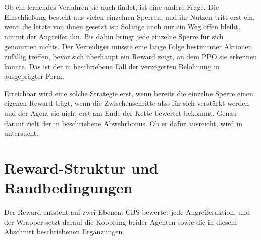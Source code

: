 Ob ein lernendes Verfahren sie auch findet, ist eine andere Frage. Die
Einschließung besteht aus vielen einzelnen Sperren, und ihr Nutzen tritt erst
ein, wenn die letzte von ihnen gesetzt ist: Solange auch nur ein Weg offen
bleibt, nimmt der Angreifer ihn. Bis dahin bringt jede einzelne Sperre für sich
genommen nichts. Der Verteidiger müsste eine lange Folge bestimmter Aktionen
zufällig treffen, bevor sich überhaupt ein Reward zeigt, an dem \ac{PPO} sie
erkennen könnte. Das ist der in  beschriebene Fall der
verzögerten Belohnung in ausgeprägter Form.

Erreichbar wird eine solche Strategie erst, wenn bereits die einzelne Sperre
einen eigenen Reward trägt, wenn die Zwischenschritte also für sich verstärkt
werden und der Agent sie nicht erst am Ende der Kette bewertet bekommt. Genau
darauf zielt der in  beschriebene Abwehrbonus. Ob er
dafür ausreicht, wird in  untersucht.

\section{Reward-Struktur und Randbedingungen}
\label{sec:rewards}

Der Reward entsteht auf zwei Ebenen: \ac{CBS} bewertet jede Angreiferaktion,
und der Wrapper setzt darauf die Kopplung beider Agenten sowie die in diesem
Abschnitt beschriebenen Ergänzungen.

